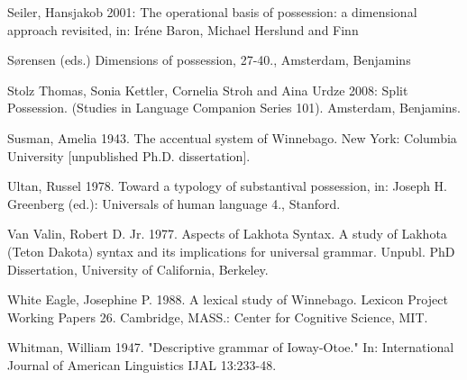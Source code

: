 \documentclass[output=paper]{LSP/langsci}
\begin{document}
\begin{reflist}
Seiler, Hansjakob 2001: The operational basis of possession: a dimensional approach revisited, in: Iréne Baron, Michael Herslund and Finn 

Sørensen (eds.) Dimensions of possession, 27-40., Amsterdam, Benjamins

Stolz Thomas, Sonia Kettler, Cornelia Stroh and Aina Urdze 2008: Split Possession. (Studies in Language Companion Series 101). Amsterdam, Benjamins.

Susman, Amelia 1943. The accentual system of Winnebago. New York: Columbia University [unpublished Ph.D. dissertation].

Ultan, Russel 1978. Toward a typology of substantival possession, in: Joseph H. Greenberg (ed.): Universals of human language 4., Stanford.

Van Valin, Robert D. Jr. 1977. Aspects of Lakhota Syntax. A study of Lakhota (Teton Dakota) syntax and its implications for universal grammar. Unpubl. PhD Dissertation, University of California, Berkeley.

White Eagle, Josephine P. 1988. A lexical study of Winnebago. Lexicon Project Working Papers 26. Cambridge, MASS.: Center for Cognitive Science, MIT.

Whitman, William 1947. "Descriptive grammar of Ioway-Otoe." In: International Journal of American Linguistics IJAL 13:233-48.

\end{reflist}
\end{document}
